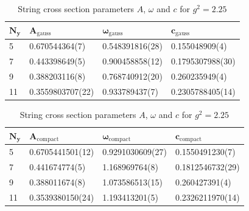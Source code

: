 \begin{table}[!hb]
\centering
\begin{tabular}{llll}
    $\mathbf{N_y}$ & $\mathbf{A_\mathrm{gauss}}$ & $\mathbf{\omega_\mathrm{gauss}}$ & $\mathbf{c_\mathrm{gauss}}$ \\ \hline
   5 & 0.670544364(7) & 0.548391816(28) & 0.155048909(4) \\
   7 & 0.443398649(5) & 0.900458858(12) & 0.1795307988(30) \\
   9 & 0.388203116(8) & 0.768740912(20) & 0.260235949(4) \\
   11 & 0.3559803707(22) & 0.933789437(7) & 0.2305788405(14) \\
\end{tabular}
\begin{tabular}{llll}
    $\mathbf{N_y}$ & $\mathbf{A_\mathrm{compact}}$ & $\mathbf{\omega_\mathrm{compact}}$ & $\mathbf{c_\mathrm{compact}}$ \\ \hline
   5 & 0.6705441501(12) & 0.9291030609(27) & 0.1550491230(7) \\
   7 & 0.441674774(5) & 1.168969764(8) & 0.1812546732(29) \\
   9 & 0.388011674(8) & 1.073586513(15) & 0.260427391(4) \\
   11 & 0.3539380150(24) & 1.193413201(5) & 0.2326211970(14) \\
\end{tabular}
\caption{String cross section parameters $A$, $\omega$ and $c$ for $g^2=2.25$}
\end{table}
